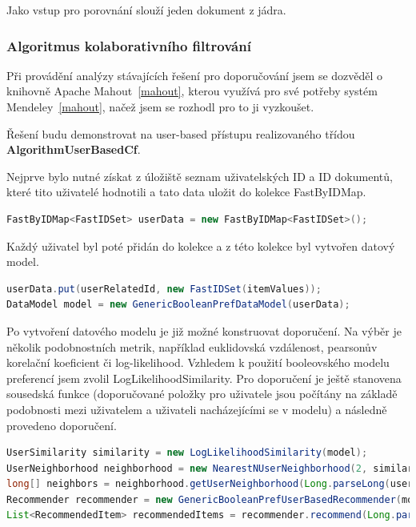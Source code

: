 \documentclass[thesis=M,czech]{FITthesis}[2014/05/07]
\begin{document}
Jako vstup pro porovnání slouží jeden dokument z jádra.

\subsubsection{Algoritmus kolaborativního filtrování}
Při provádění analýzy stávajících řešení pro doporučování jsem se dozvěděl o knihovně Apache Mahout~\ref{mahout}, kterou využívá pro své potřeby systém Mendeley~\ref{mahout}, načež jsem se rozhodl pro to ji vyzkoušet.

Řešení budu demonstrovat na user-based přístupu realizovaného třídou \textbf{AlgorithmUserBasedCf}.

Nejprve bylo nutné získat z úložiště seznam uživatelských ID a ID dokumentů, které tito uživatelé hodnotili a tato data uložit do kolekce FastByIDMap.

\begin{lstlisting}[language=java]
FastByIDMap<FastIDSet> userData = new FastByIDMap<FastIDSet>();
\end{lstlisting}

Každý uživatel byl poté přidán do kolekce a z této kolekce byl vytvořen datový model.

\begin{lstlisting}[language=java]
userData.put(userRelatedId, new FastIDSet(itemValues));
DataModel model = new GenericBooleanPrefDataModel(userData);
\end{lstlisting}

Po vytvoření datového modelu je již možné konstruovat doporučení. Na výběr je několik podobnostních metrik, například euklidovská vzdálenost, pearsonův korelační koeficient či log-likelihood. Vzhledem k použití booleovského modelu preferencí jsem zvolil LogLikelihoodSimilarity. Pro doporučení je ještě stanovena sousedská funkce (doporučované položky pro uživatele jsou počítány na základě podobnosti mezi uživatelem a uživateli nacházejícími se v modelu) a následně provedeno doporučení.

\begin{lstlisting}[language=java]
UserSimilarity similarity = new LogLikelihoodSimilarity(model);
UserNeighborhood neighborhood = new NearestNUserNeighborhood(2, similarity, model);
long[] neighbors = neighborhood.getUserNeighborhood(Long.parseLong(userId));
Recommender recommender = new GenericBooleanPrefUserBasedRecommender(model, neighborhood, similarity);
List<RecommendedItem> recommendedItems = recommender.recommend(Long.parseLong(userId), limit);
\end{lstlisting}
\end{document}
